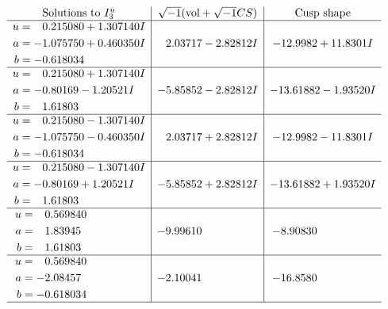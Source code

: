 \documentclass[1p]{elsarticle_modified}
\theoremstyle{definition}
\newcommand{\I}{\sqrt{-1}}
\begin{document}
$$\begin{array}{c|c|c}  
\text{Solutions to }I^u_{3}& \I (\text{vol} + \sqrt{-1}CS) & \text{Cusp shape}\\
 \hline 
\begin{aligned}
u &= \phantom{-}0.215080 + 1.307140 I \\
a &= -1.075750 + 0.460350 I \\
b &= -0.618034\phantom{ +0.000000I}\end{aligned}
 & \phantom{-}2.03717 - 2.82812 I & -12.9982 + 11.8301 I \\ \hline\begin{aligned}
u &= \phantom{-}0.215080 + 1.307140 I \\
a &= -0.80169 - 1.20521 I \\
b &= \phantom{-}1.61803\phantom{ +0.000000I}\end{aligned}
 & -5.85852 - 2.82812 I & -13.61882 - 1.93520 I \\ \hline\begin{aligned}
u &= \phantom{-}0.215080 - 1.307140 I \\
a &= -1.075750 - 0.460350 I \\
b &= -0.618034\phantom{ +0.000000I}\end{aligned}
 & \phantom{-}2.03717 + 2.82812 I & -12.9982 - 11.8301 I \\ \hline\begin{aligned}
u &= \phantom{-}0.215080 - 1.307140 I \\
a &= -0.80169 + 1.20521 I \\
b &= \phantom{-}1.61803\phantom{ +0.000000I}\end{aligned}
 & -5.85852 + 2.82812 I & -13.61882 + 1.93520 I \\ \hline\begin{aligned}
u &= \phantom{-}0.569840\phantom{ +0.000000I} \\
a &= \phantom{-}1.83945\phantom{ +0.000000I} \\
b &= \phantom{-}1.61803\phantom{ +0.000000I}\end{aligned}
 & -9.99610\phantom{ +0.000000I} & -8.90830\phantom{ +0.000000I} \\ \hline\begin{aligned}
u &= \phantom{-}0.569840\phantom{ +0.000000I} \\
a &= -2.08457\phantom{ +0.000000I} \\
b &= -0.618034\phantom{ +0.000000I}\end{aligned}
 & -2.10041\phantom{ +0.000000I} & -16.8580\phantom{ +0.000000I}\\
 \hline 
 \end{array}$$\newpage
\end{document}
